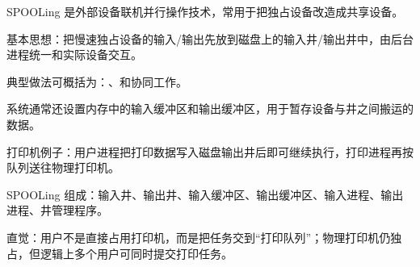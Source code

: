 \begin{points}
  \item SPOOLing 是外部设备联机并行操作技术，常用于把独占设备改造成共享设备。
  \item 基本思想：把慢速独占设备的输入/输出先放到磁盘上的输入井/输出井中，由后台进程统一和实际设备交互。
  \item 典型做法可概括为：、和协同工作。
  \item 系统通常还设置内存中的输入缓冲区和输出缓冲区，用于暂存设备与井之间搬运的数据。
  \item 打印机例子：用户进程把打印数据写入磁盘输出井后即可继续执行，打印进程再按队列送往物理打印机。
  \item SPOOLing 组成：输入井、输出井、输入缓冲区、输出缓冲区、输入进程、输出进程、井管理程序。
  \item 直觉：用户不是直接占用打印机，而是把任务交到“打印队列”；物理打印机仍独占，但逻辑上多个用户可同时提交打印任务。
\end{points}
